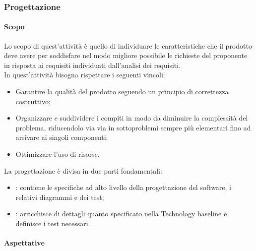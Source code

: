 \subsubsection{Progettazione}
\label{ssub:progettazione}
 
\paragraph{Scopo}
\label{par:progettazione:scopo}

Lo scopo di quest'attività è quello di individuare le caratteristiche che il prodotto deve avere per soddisfare nel 
modo migliore possibile le richieste del proponente in risposta ai requisiti individuati dall'analisi dei requisiti. \\
In quest'attività bisogna rispettare i seguenti vincoli:
\begin{itemize}
    \item Garantire la qualità del prodotto seguendo un principio di correttezza costruttivo;
    \item Organizzare e suddividere i compiti in modo da diminuire la complessità del problema, riducendolo via via in 
    sottoproblemi sempre più elementari fino ad arrivare ai singoli componenti;
    \item Ottimizzare l'uso di risorse.
\end{itemize}

La progettazione è divisa in due parti fondamentali:
\begin{itemize}
    \item {}: contiene le specifiche ad alto livello della progettazione del software, 
    i relativi diagrammi  e dei test;
    \item {}: arricchisce di dettagli quanto specificato nella Technology baseline e 
    definisce i test necessari.
\end{itemize}

\paragraph{Aspettative}

